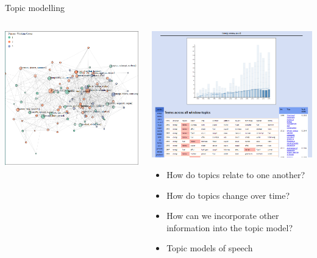 \documentclass[9pt]{beamer}
\begin{document}
\begin{frame}{Topic modelling}

\begin{columns}
	\begin{column}{0.4\linewidth}
		\begin{center}
			\includegraphics[width=1\linewidth]{images/network_wg_65.png}

			
		\end{center}
	\end{column}
	\begin{column}{0.6\linewidth}
		\begin{center}
			\includegraphics[width=0.7\linewidth]{images/time_renewed.png}
			\begin{itemize}
				\item How do topics relate to one another?
				\item How do topics change over time? \citep{Greene2016}
				\item How can we incorporate other information into the topic model? \citep{Tvinnereim2015, Roberts2014a}
				\item Topic models of speech \citep{El-Assady2016}
				

\end{itemize}
\end{center}
\end{column}
\end{columns}
\end{frame}
\end{document}
